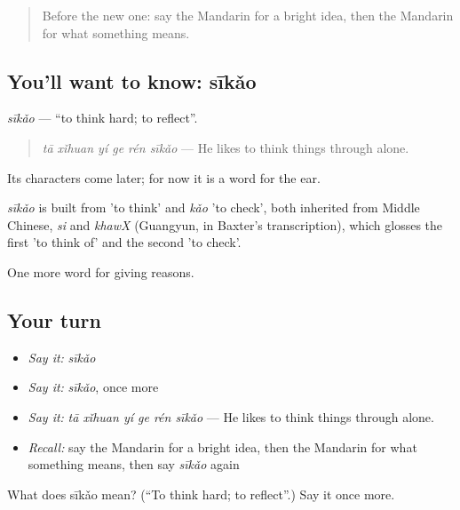 \label{lesson:ZH-C347-sikao}



\begin{quote}
Before the new one: say the Mandarin for a bright idea, then the Mandarin for what something means.
\end{quote}

\subsection*{You'll want to know: sīkǎo}
\emph{sīkǎo} — \textquotedblleft{}to think hard; to reflect\textquotedblright{}.

\begin{quote}
\emph{tā xǐhuan yí ge rén sīkǎo} — He likes to think things through alone.
\end{quote}

Its characters come later; for now it is a word for the ear.

\begin{cousinweb}
\emph{sīkǎo} is built from  'to think' and \emph{kǎo} 'to check', both inherited from Middle Chinese, \emph{si} and \emph{khawX} (Guangyun, in Baxter's transcription), which glosses the first 'to think of' and the second 'to check'.
\end{cousinweb}

\begin{grammarlens}[title={What you've built}]
One more word for giving reasons.
\end{grammarlens}

\subsection*{Your turn}
\begin{itemize}
\raggedright
  \item \emph{Say it:} \emph{sīkǎo}
  \item \emph{Say it:} \emph{sīkǎo}, once more
  \item \emph{Say it:} \emph{tā xǐhuan yí ge rén sīkǎo} — He likes to think things through alone.
  \item \emph{Recall:} say the Mandarin for a bright idea, then the Mandarin for what something means, then say \emph{sīkǎo} again
\end{itemize}

\begin{tcolorbox}[breakable,colback=teal!4,colframe=teal!35!black,title={Before you move on}]
What does sīkǎo mean? (\textquotedblleft{}To think hard; to reflect\textquotedblright{}.) Say it once more.
\end{tcolorbox}

